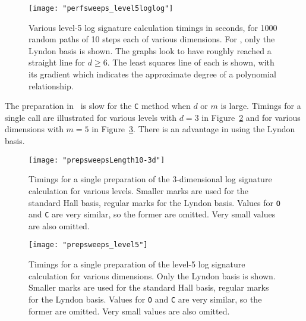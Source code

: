 \begin{figure}[H]
\begin{center}
	\texttt{[image: "perfsweeps\_level5loglog"]}
	\caption[Level 5 log signature calculation timings]{\label{fig:logsigtimingm5}Various level-5 log signature calculation timings in seconds, for 1000 random paths of 10 steps each of various dimensions. For \ii, only the Lyndon basis is shown. The graphs look to have roughly reached a straight line for $d\ge6$. The least squares line of each is shown, with its gradient which indicates the approximate degree of a polynomial relationship.}%
\end{center}
\end{figure}
The preparation in \ii\ is slow for the \verb|C| method when $d$ or $m$ is large. Timings for a single call are illustrated for various levels with $d=3$ in Figure~\ref{fig:preptiming3d} and for various dimensions with $m=5$ in Figure~\ref{fig:preptimingm5}. There is an advantage in using the Lyndon basis.
\begin{figure}[H]
\begin{center}
	\texttt{[image: "prepsweepsLength10-3d"]}
	\caption[3d log signature preparation timings]{\label{fig:preptiming3d}Timings for a single preparation of the 3-dimensional log signature calculation for various levels. Smaller marks are used for the standard Hall basis, regular marks for the Lyndon basis. Values for \texttt{O} and \texttt{C} are very similar, so the former are omitted. Very small values are also omitted.}
\end{center}
\end{figure}
\begin{figure}[H]
\begin{center}
	\texttt{[image: "prepsweeps\_level5"]}
	\caption[Level 5 log signature preparation timings]{\label{fig:preptimingm5}Timings for a single preparation of the level-5 log signature calculation for various dimensions. Only the Lyndon basis is shown. Smaller marks are used for the standard Hall basis, regular marks for the Lyndon basis. Values for \texttt{O} and \texttt{C} are very similar, so the former are omitted. Very small values are also omitted.}
\end{center}
\end{figure}

